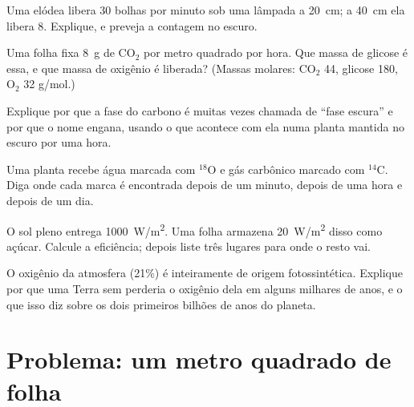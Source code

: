 \begin{exercise}[$\star\star$]\label{exo:g12:photosynthesis:10}
Uma elódea libera 30 bolhas por minuto sob uma lâmpada a \qty{20}{cm};
a \qty{40}{cm} ela libera 8. Explique, e preveja a contagem no escuro.
\end{exercise}

\begin{exercise}[$\star\star$]\label{exo:g12:photosynthesis:11}
Uma folha fixa \qty{8}{g} de $\mathrm{CO_2}$ por metro quadrado por
hora. Que massa de glicose é essa, e que massa de oxigênio é liberada?
(Massas molares: $\mathrm{CO_2}$ 44, glicose 180, $\mathrm{O_2}$ 32
\unit{g/mol}.)
\end{exercise}

\begin{exercise}[$\star\star\star$]\label{exo:g12:photosynthesis:12}
Explique por que a fase do carbono é muitas vezes chamada de ``fase
escura'' e por que o nome engana, usando o que acontece com ela numa
planta mantida no escuro por uma hora.
\end{exercise}

\begin{exercise}[$\star\star\star$]\label{exo:g12:photosynthesis:13}
Uma planta recebe água marcada com $^{18}$O e gás carbônico marcado com
$^{14}$C. Diga onde cada marca é encontrada depois de um minuto, depois
de uma hora e depois de um dia.
\end{exercise}

\begin{exercise}[$\star\star\star$]\label{exo:g12:photosynthesis:14}
O sol pleno entrega \qty{1000}{W/m^2}. Uma folha armazena
\qty{20}{W/m^2} disso como açúcar. Calcule a eficiência; depois liste
três lugares para onde o resto vai.
\end{exercise}

\begin{exercise}[$\star\star\star$]\label{exo:g12:photosynthesis:15}
O oxigênio da atmosfera (21\%) é inteiramente de origem
fotossintética. Explique por que uma Terra sem  perderia o
oxigênio dela em alguns milhares de anos, e o que isso diz sobre os
dois primeiros bilhões de anos do planeta.
\end{exercise}

\section{Problema: um metro quadrado de folha}

